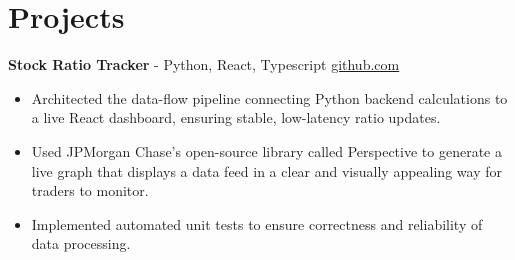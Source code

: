 \documentclass[11pt]{article}       %
\begin{document}

\vspace{-18.5pt}

\section*{Projects}

\textbf{Stock Ratio Tracker}{ - Python, React, Typescript} \hfill \href{https://github.com/Monica20030707/Trading-Dashboard_UI}{github.com} \\
\vspace{-9pt}
\begin{itemize}
  \item Architected the data-flow pipeline connecting Python backend calculations to a live React dashboard, ensuring stable, low-latency ratio updates. 
  \item Used JPMorgan Chase’s open-source library called Perspective to generate a live graph that displays a data feed in a clear and visually appealing way for traders to monitor.
  \item Implemented automated unit tests to ensure correctness and reliability of data processing.
\end{itemize}
\end{document}
